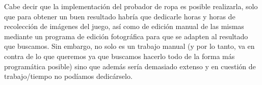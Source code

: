 Cabe decir que la implementación del probador de ropa es posible realizarla, solo que para obtener un buen resultado habría que dedicarle horas y horas de recolección de imágenes del juego, así como de edición manual de las mismas mediante un programa de edición fotográfica para que se adapten al resultado que buscamos. Sin embargo, no solo es un trabajo manual (y por lo tanto, va en contra de lo que queremos ya que buscamos hacerlo todo de la forma más programática posible) sino que además sería demasiado extenso y en cuestión de trabajo/tiempo no podíamos dedicárselo.



	